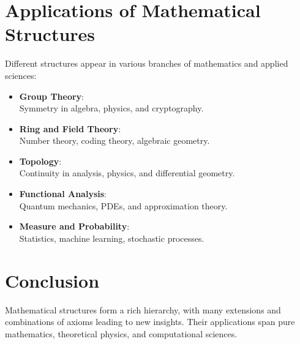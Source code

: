 \documentclass{article}
\begin{document}
\section{Applications of Mathematical Structures}
Different structures appear in various branches of 
mathematics and applied sciences:
\begin{itemize}
    \item \textbf{Group Theory}: \\  
        Symmetry in algebra, physics, and cryptography.
    \item \textbf{Ring and Field Theory}: \\  
        Number theory, coding theory, algebraic geometry.
    \item \textbf{Topology}: \\ 
        Continuity in analysis, physics, and differential geometry.
    \item \textbf{Functional Analysis}: \\  
        Quantum mechanics, PDEs, and approximation theory.
    \item \textbf{Measure and Probability}: \\  
        Statistics, machine learning, stochastic processes.
\end{itemize}

\section{Conclusion}
Mathematical structures form a rich hierarchy, 
with many extensions and combinations of axioms 
leading to new insights. Their applications span pure mathematics, 
theoretical physics, and computational sciences.
\end{document}
